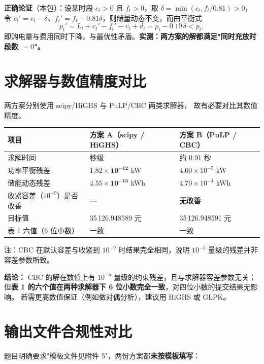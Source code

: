 \documentclass[12pt,a4paper]{ctexart}
\begin{document}
\textbf{正确论证}（本包）：设某时段 $c_t>0$ 且 $f_t>0$，取 $\delta=\min(c_t,f_t/0.81)>0$，
令 $c_t'=c_t-\delta$、$f_t'=f_t-0.81\delta$，则储量动态不变，而由平衡式
\[
p_t'=L_t+c_t'-f_t'-v_t+d_t=p_t-0.19\,\delta<p_t,
\]
即购电量与费用同时下降，与最优性矛盾。\textbf{实测：两方案的解都满足"同时充放时段数 $=0$"。}

\section{求解器与数值精度对比}

两方案分别使用 scipy/HiGHS\cite{scipy,highs} 与 PuLP/CBC\cite{pulp,cbc} 两类求解器，
故有必要对比其数值精度。

\begin{center}
\begin{tabular}{@{}l l l@{}}
\toprule
项目 & 方案 A（scipy / HiGHS） & 方案 B（PuLP / CBC） \\
\midrule
求解时间 & 秒级 & 约 0.91 秒 \\
功率平衡残差 & $\mathbf{1.82\times10^{-12}}$ kW & $4.00\times10^{-5}$ kW \\
储能动态残差 & $\mathbf{4.55\times10^{-13}}$ kWh & $4.70\times10^{-4}$ kWh \\
收紧容差（$10^{-9}$）是否改善 & --- & \textbf{无改善} \\
目标值 & 35\,126.948589 元 & 35\,126.948591 元 \\
表 1 六值（6 位小数） & 一致 & 一致 \\
\bottomrule
\end{tabular}
\end{center}

\noindent\footnotesize 注：CBC 在默认容差与收紧到 $10^{-9}$ 时结果完全相同，说明 $10^{-5}$ 量级的残差并非容差参数所致。

\textbf{结论：} CBC 的解在数值上有 $10^{-5}$ 量级的约束残差，且与求解器容差参数无关；
但\textbf{表 1 的六个值在两种求解器下 6 位小数完全一致}，对四位小数的提交结果无影响。
若需更高数值保证（例如做对偶分析），建议用 HiGHS 或 GLPK。

\section{输出文件合规性对比}

题目明确要求"模板文件见附件 5"，两份方案都\textbf{未按模板填写}：
\end{document}
